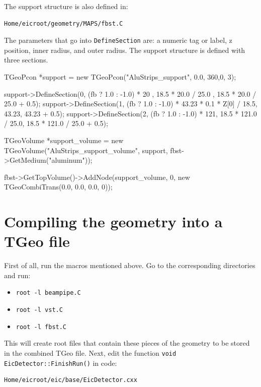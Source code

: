 \documentclass[12pt]{article}
\begin{document}
The support structure is also defined in:

\begin{tcolorbox}
\begin{verbatim}
Home/eicroot/geometry/MAPS/fbst.C
\end{verbatim}  
\end{tcolorbox}

The parameters that go into \verb|DefineSection| are: a numeric tag or label, z position, inner radius, and outer radius.
The support structure is defined with three sections. 

\begin{tcolorbox}
\begin{verbnobox}[\scriptsize]
TGeoPcon *support = new TGeoPcon("AluStrips_support", 0.0, 360,0, 3);

support->DefineSection(0, (fb ? 1.0 : -1.0) * 20 , 18.5 * 20.0 / 25.0 , 18.5 *  20.0 / 25.0 + 0.5);
support->DefineSection(1, (fb ? 1.0 : -1.0) * 43.23 * 0.1 * Z[0] / 18.5, 43.23, 43.23 + 0.5);
support->DefineSection(2, (fb ? 1.0 : -1.0) * 121, 18.5 * 121.0 / 25.0, 18.5 * 121.0 / 25.0 + 0.5);

TGeoVolume *support_volume = new TGeoVolume("AluStrips_support_volume", support, fbst->GetMedium("aluminum"));

fbst->GetTopVolume()->AddNode(support_volume, 0, new TGeoCombiTrans(0.0, 0.0, 0.0, 0));
\end{verbnobox}  
\end{tcolorbox}

\section{Compiling the geometry into a TGeo file}

First of all, run the macros mentioned above. Go to the corresponding directories and run:

\begin{itemize}
\item \verb|root -l beampipe.C|
\item \verb|root -l vst.C|
\item \verb|root -l fbst.C|
\end{itemize}
This will create root files that contain these pieces of the geometry to be stored in the combined TGeo file.
Next, edit the function \verb|void EicDetector::FinishRun()| in code:

\begin{tcolorbox}
\begin{verbatim}
Home/eicroot/eic/base/EicDetector.cxx
\end{verbatim}  
\end{tcolorbox}
\end{document}
